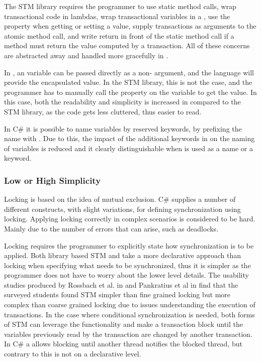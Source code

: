 The \ac{STM} library requires the programmer to use static method calls, wrap transactional code in lambdas, wrap transactional variables in a , use the  property when getting or setting a value, supply  transactions as arguments to the atomic method call, and write return in front of the static method call if a method must return the value computed by a transaction. All of these concerns are abstracted away and handled more gracefully in \stmname.

In \stmname, an  variable can be passed directly as a non- argument, and the language will provide the encapsulated value. In the \ac{STM} library, this is not the case, and the programmer has to manually call the  property on the  variable to get the value. In this case, both the readability and simplicity is increased in \stmname compared to the \ac{STM} library, as the code gets less cluttered, thus easier to read.

In C\# it is possible to name variables by reserved keywords, by prefixing the name with . Due to this, the impact of the additional keywords in \stmname on the naming of variables is reduced and  it clearly distinguishable when  is used as a name or a keyword.

\subsubsection{Low or High Simplicity}\label{subsec:simplicity}
Locking is based on the idea of mutual exclusion. C\# supplies a number of different constructs, with slight variations, for defining synchronization using locking. Applying locking correctly in complex scenarios is considered to be hard\cite[p. 56]{sutter2005software}. Mainly due to the number of errors that can arise, such as deadlocks. 

Locking requires the programmer to explicitly state how synchronization is to be applied. Both library based \ac{STM} and \stmname take a more declarative approach than locking when specifying what needs to be synchronized, thus it is simpler as the programmer does not have to worry about the lower level details. The usability studies produced by Rossbach et al. in \cite{rossbach2010transactional} and Pankratius et al in \cite{pankratius2009does} find that the surveyed students found \ac{STM} simpler than fine grained locking but more complex than coarse grained locking due to issues understanding the execution of transactions. In the case where conditional synchronization is needed, both forms of \ac{STM} can leverage the  functionality and make a transaction block until the variables previously read by the transaction are changed by another transaction. In C\# a  allows blocking until another thread notifies the blocked thread, but contrary to  this is not on a declarative level.

